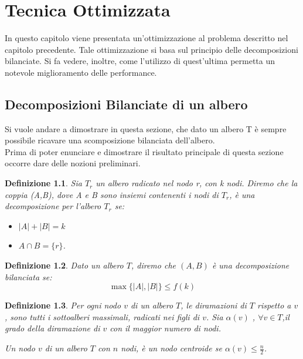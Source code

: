 \chapter{Tecnica Ottimizzata}

In questo capitolo viene presentata un'ottimizzazione al problema descritto nel capitolo precedente.
Tale ottimizzazione si basa sul principio delle decomposizioni bilanciate.
Si fa vedere, inoltre, come l'utilizzo di quest'ultima permetta un notevole miglioramento delle performance.

\section{Decomposizioni Bilanciate di un albero}
Si vuole andare a dimostrare in questa sezione, che dato un albero T \`e sempre possibile ricavare una scomposizione bilanciata dell'albero.
\\
Prima di poter enunciare e dimostrare il risultato principale di questa sezione occorre dare delle nozioni preliminari.

\newtheorem{definizione}{Definizione}[section]

\begin{definizione}
	\label{definizioneDeco}
Sia $T_r$ un albero radicato nel nodo r, con k nodi.
Diremo che la coppia (A,B), dove  A e B sono insiemi contenenti i nodi di $T_r$, \`e una decomposizione per l'albero $ T_r $ se:
\begin{itemize}
	\item $| A | + | B | = k$
	\item $A \cap B = \{r\}$.
\end{itemize}
\end{definizione}


\begin{definizione}
\label{lemmaDeco}
Dato un albero $ T $, diremo che $ (A,B) $ \`e una decomposizione bilanciata se:
\begin{equation*}
	\max{ \{|A| , |B| \} }  \le  f(k)
\end{equation*}
\end{definizione}





\begin{definizione}
Per ogni nodo $ v $ di un albero $ T $, le diramazioni di $ T $  rispetto a $ v $, sono tutti i sottoalberi massimali, radicati nei figli di $ v $. 
Sia  $\alpha(v)$  , $ \forall v \in T $,il grado della diramazione di $ v $ con il maggior numero di nodi.

Un nodo $ v $ di un albero $ T $ con $ n $ nodi, \`e un nodo centroide se $\alpha(v)\le\frac{n}{2}$.
\end{definizione}\mbox{}

